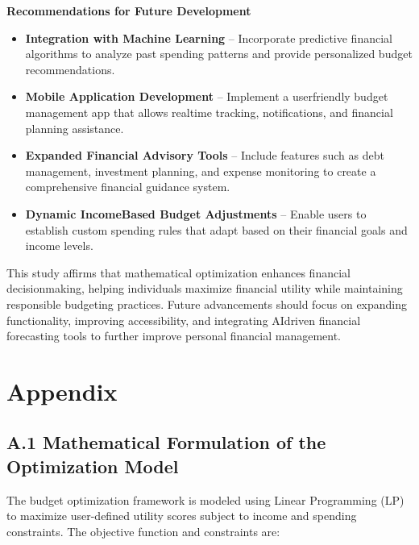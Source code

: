 \documentclass{article}
\begin{document}
\textbf{Recommendations for Future Development}
\begin{itemize}
    \item \textbf{Integration with Machine Learning} – Incorporate predictive financial algorithms to analyze past spending patterns and provide personalized budget recommendations.
    \item \textbf{Mobile Application Development} – Implement a userfriendly budget management app that allows realtime tracking, notifications, and financial planning assistance.
    \item \textbf{Expanded Financial Advisory Tools} – Include features such as debt management, investment planning, and expense monitoring to create a comprehensive financial guidance system.
    \item \textbf{Dynamic IncomeBased Budget Adjustments} – Enable users to establish custom spending rules that adapt based on their financial goals and income levels.
\end{itemize}

This study affirms that mathematical optimization enhances financial decisionmaking, helping individuals maximize financial utility while maintaining responsible budgeting practices. Future advancements should focus on expanding functionality, improving accessibility, and integrating AIdriven financial forecasting tools to further improve personal financial management.






\appendix
\section*{Appendix}

\subsection*{A.1 Mathematical Formulation of the Optimization Model}

The budget optimization framework is modeled using Linear Programming (LP) to maximize user-defined utility scores subject to income and spending constraints. The objective function and constraints are:
\end{document}
